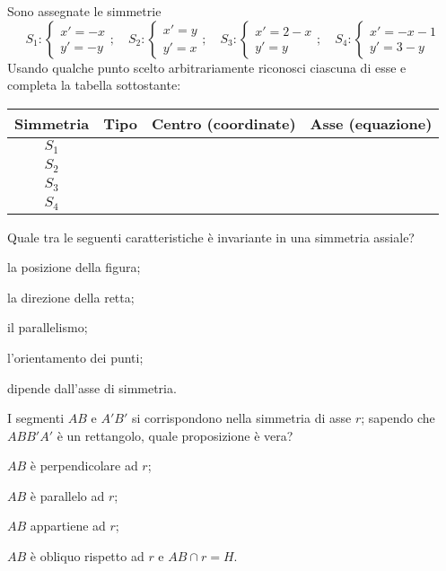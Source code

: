 \begin{esercizio}
\label{ese:8.39} %
Sono assegnate le simmetrie
\[S_1:\begin{cases}x'=-x\\y'=-y\end{cases};\quad S_2:\begin{cases}x'=y\\y'=x\end{cases};\quad
S_3:\begin{cases}x'=2-x\\y'=y\end{cases};\quad S_4:\begin{cases}x'=-x-1\\y'=3-y\end{cases}\]
Usando qualche punto scelto arbitrariamente riconosci ciascuna di esse e completa la tabella sottostante:
\begin{center}
\begin{tabular}{cccc}
\toprule
Simmetria & Tipo & Centro (coordinate) & Asse (equazione)\\
\midrule
$S_1$ & & & \\
$S_2$ & & & \\
$S_3$ & & & \\
$S_4$ & & & \\
\bottomrule
\end{tabular}
\end{center}
\end{esercizio}

\begin{esercizio}
\label{ese:8.40} %
Quale tra le seguenti caratteristiche è invariante in una simmetria assiale?
\begin{enumeratea}
\item la posizione della figura;
\item la direzione della retta;
\item il parallelismo;
\item l'orientamento dei punti;
\item dipende dall'asse di simmetria.
\end{enumeratea}
\end{esercizio}

\begin{esercizio}
\label{ese:8.41} %
I segmenti $AB$ e $A'B'$ si corrispondono nella simmetria di asse $r$; sapendo che $ABB'A'$ è un rettangolo, quale proposizione è vera?
\begin{enumeratea}
\item $AB$ è perpendicolare ad $r$;
\item $AB$ è parallelo ad $r$;
\item $AB$ appartiene ad $r$;
\item $AB$ è obliquo rispetto ad $r$ e $AB\cap r=H$.
\end{enumeratea}
\end{esercizio}

